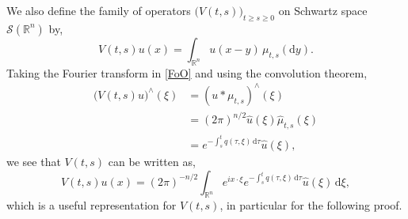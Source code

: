 \documentclass[a4paper, 12pt]{report}
\theoremstyle{remark}
\theoremstyle{definition}
\begin{document}
We also define the family of operators $\big(V(t, s)\big)_{t \ge s \ge 0}$ on Schwartz space $\mathcal{S}(\mathbb{R}^n)$ by,
\begin{equation}\label{FoO}
V(t, s)u(x) = \int_{\mathbb{R}^n}u(x - y)\,\mu_{t, s}(\mathrm{d}y).
\end{equation}
Taking the Fourier transform in \eqref{FoO} and using the convolution theorem,
\begin{align}
\big(V(t, s)u\big)^\wedge(\xi) & = (u\ast\mu_{t, s})^\wedge(\xi)\nonumber\\
& = (2\pi)^{n/2}\hat{u}(\xi)\hat{\mu}_{t, s}(\xi)\nonumber\\
& = e^{-\int_s^tq(\tau, \xi)\,\mathrm{d}\tau}\hat{u}(\xi)\nonumber,
\end{align}
we see that $V(t, s)$ can be written as,
\begin{equation}\label{Op}
V(t, s)u(x) = (2\pi)^{-n/2}\int_{\mathbb{R}^n}e^{ix\cdot\xi}e^{-\int_s^tq(\tau, \xi)\,\mathrm{d}\tau}\hat{u}(\xi)\,\mathrm{d}\xi,
\end{equation}
which is a useful representation for $V(t, s)$, in particular for the following proof.
\end{document}
